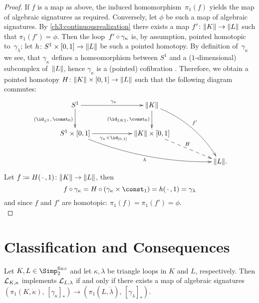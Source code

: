 \begin{proof}
    If $f$ is a map as above, the induced homomorphism~$\pi_1(f)$ yields
    the map of algebraic signatures as required. Conversely, let $\phi$
    be such a map of algebraic signatures. By \cref{ch3:continuousrealization}
    there exists a map $f'\colon\lVert K\rVert\to\lVert L\rVert$ such that $\pi_1(f')=\phi$.
    Then the loop~$f'\after\gamma_\kappa$ is, by assumption, pointed homotopic
    to~$\gamma_\lambda$; let $h\colon S^1\times[0,1]\to\lVert L\rVert$ be such a
    pointed homotopy. By definition of~$\gamma_\kappa$ we see, that
    $\gamma_\kappa$ defines a homeomorphism between $S^1$ and a
    ($1$-dimensional) subcomplex of~$\lVert L\rVert$, hence $\gamma_\kappa$
    is a (pointed) cofibration .
    Therefore, we obtain a pointed homotopy
    $H\colon\lVert K\rVert\times[0,1]\to\lVert L\rVert$ such that the following diagram
    commutes:
    \[
        \xymatrix@C=2cm{
            S^1
                \ar[r]^{\gamma_\kappa}
                \ar[d]_{(\id_{S^1},\,\const_0)}
            & \geom K
                \ar[d]_{(\id_{\geom K},\,\const_0)}
                \ar@/^1pc/[rdd]^{f'}
            \\
            S^1\times[0,1]
                \ar[r]_{\gamma_\kappa\times\id_{[0,1]}}
                \ar@/_1pc/[rrd]_h
            & \geom{K}\times[0,1]
                \ar@{-->}[rd]^H
            \\
            & & \geom L
            \rlap{.}
        }
    \]
    Let $f \coloneqq H(\,\cdot\,,1)\colon \lVert K\rVert\to \lVert L\rVert$, then
    \[ f\after\gamma_\kappa = H \after (\gamma_\kappa\times\const_1)
        = h(\scdot,1) = \gamma_\lambda
    \]
    and since $f$ and $f'$ are homotopic: $\pi_1(f) = \pi_1(f') = \phi$.
    \\
\end{proof}


\section{Classification and Consequences}
\label{ch2:sec:consequences}
%
\begin{thTheorem}
    \label{ch3:classification}
    Let $K,L\in\finSimp$ and let $\kappa,\lambda$ be triangle loops
    in $K$ and $L$, respectively.
    Then $\mathcal{L}_{K,\kappa}$ implements $\mathcal{L}_{L,\lambda}$ if and only if
    there exists a map of algebraic signatures
    $( \pi_1(K,\dot\kappa), \, [\gamma_\kappa]_\ast )
        \to ( \pi_1(L,\dot\lambda), \, [\gamma_\lambda]_\ast )$.
\end{thTheorem}

